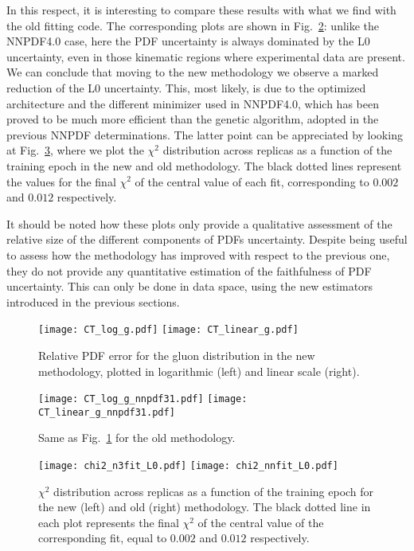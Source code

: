 In this respect, it is interesting to compare these results with what we find with the old fitting code. The corresponding
plots are shown in Fig.~\ref{fig:CT_uncertainty_g_nnpdf3.1}: unlike the NNPDF4.0 case, here the PDF uncertainty 
is always dominated by the L0 uncertainty, even in those kinematic regions where experimental data are present.
We can conclude that moving to the new methodology we observe a marked reduction of the L0 uncertainty.
This, most likely, is due to the optimized architecture and the different minimizer used in NNPDF4.0, 
which has been proved to be much more efficient than the genetic algorithm, adopted in the previous NNPDF determinations.
The latter point can be appreciated by looking at Fig.~\ref{fig:chi2_vs_epoch},
where we plot the $\chi^2$ distribution across replicas as a function of the training epoch in the new and old methodology.
The black dotted lines represent the values for the final $\chi^2$ of the central value of each fit, corresponding
to $0.002$ and $0.012$ respectively.

It should be noted how these plots only provide a qualitative assessment of the relative size of the different
components of PDFs uncertainty. Despite being useful to assess how the methodology has improved with respect
to the previous one, they do not provide any quantitative estimation of the faithfulness of PDF uncertainty.
This can only be done in data space, using the new estimators introduced in the previous sections.

\begin{figure}[ht]
    \centering
    \texttt{[image: CT\_log\_g.pdf]}
    \texttt{[image: CT\_linear\_g.pdf]}
    \caption{Relative PDF error for the gluon distribution in the new methodology,
    plotted in logarithmic (left) and linear scale (right).}
    \label{fig:CT_uncertainty_g}    
\end{figure}

\begin{figure}[ht]
    \centering
    \texttt{[image: CT\_log\_g\_nnpdf31.pdf]}
    \texttt{[image: CT\_linear\_g\_nnpdf31.pdf]}
    \caption{Same as Fig.~\ref{fig:CT_uncertainty_g} for the old methodology.}
    \label{fig:CT_uncertainty_g_nnpdf3.1}    
\end{figure}

\begin{figure}[ht]
    \centering
    \texttt{[image: chi2\_n3fit\_L0.pdf]}
    \texttt{[image: chi2\_nnfit\_L0.pdf]}
    \caption{$\chi^2$ distribution across replicas as a function of the training epoch for the new (left)
    and old (right) methodology. The black dotted line in each plot represents the final 
    $\chi^2$ of the central value of the corresponding fit, equal to $0.002$ and $0.012$ respectively.}
    \label{fig:chi2_vs_epoch}    
\end{figure}




